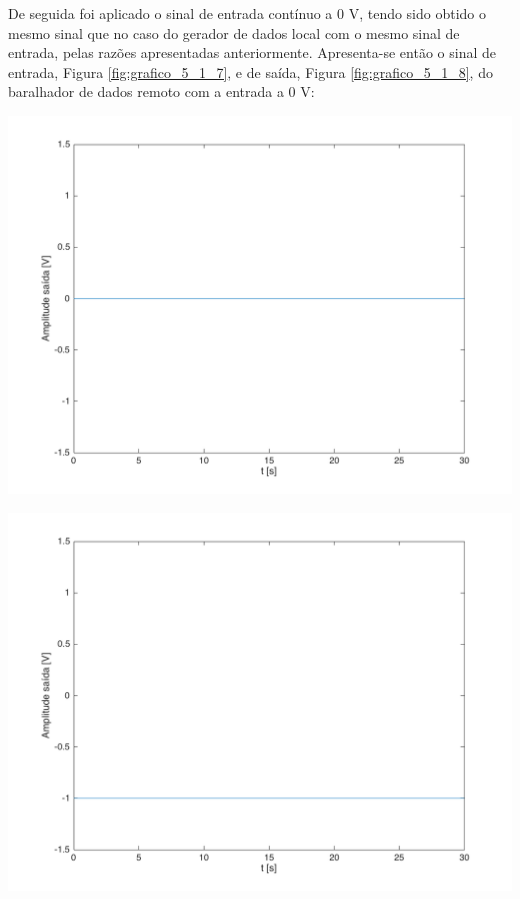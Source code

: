 \documentclass[a4paper,11pt]{report}
\begin{document}
De seguida foi aplicado o sinal de entrada contínuo a 0 V, tendo sido obtido o mesmo sinal que no caso do gerador de dados local com o mesmo sinal de entrada, pelas razões apresentadas anteriormente. Apresenta-se então o sinal de entrada, Figura \ref{fig:grafico_5_1_7}, e de saída, Figura \ref{fig:grafico_5_1_8}, do baralhador de dados remoto com a entrada a 0 V:

\begin{minipage}[t]{0.5\textwidth}
  \includegraphics[angle=0,width=1\textwidth]{grafico_5_1_7.png}
     \label{fig:grafico_5_1_7}
     \end{minipage}%
\hspace{0.3cm}
\begin{minipage}[t]{0.5\textwidth}
  \includegraphics[angle=0,width=1\textwidth]{grafico_5_1_8.png}
     \label{fig:grafico_5_1_8}
     \end{minipage}\\
\end{document}
